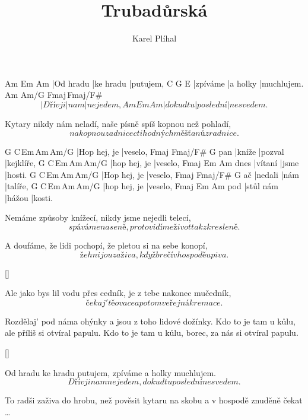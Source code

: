 \documentclass{song}
\title{Trubadůrská}
\author{Karel Plíhal}
\begin{document}
\begin{multicols}{2}

\strophe
Am        Em        Am
|Od hradu |ke hradu |putujem,
C        G        E\7
|zpíváme |a holky |muchlujem.
   Am      Am/G Fmaj\7\,Fmaj\7/F\#
\[ |Dřív ji|nam |nejedem,
Am        Em        Am
|dokud tu |poslední |nesvedem. \]
\endstrophe

\strophe*
Kytary nikdy nám neladí,
naše písně spíš kopnou než pohladí,
\[ nakopnou zadnice
ctihodných měšťanů z radnice. \]
\endstrophe

G            C\,Em\7\,Am\,Am/G
|Hop hej, je |veselo,
    Fmaj\7 Fmaj\7/F\# G
pan |kníže |pozval |kejklíře,
G            C\,Em\7\,Am\,Am/G
|hop hej, je |veselo,
     Fmaj\7  Em    Am
dnes |vítaní |jsme |hosti.
G            C\,Em\7\,Am\,Am/G
|Hop hej, je |veselo,
   Fmaj\7  Fmaj\7/F\# G
ač |nedali |nám |talíře,
G            C\,Em\7\,Am\,Am/G
|hop hej, je |veselo,
    Fmaj\7    Em     Am
pod |stůl nám |hážou |kosti.
\endstrophe

\strophe*
Nemáme způsoby knížecí,
nikdy jsme nejedli telecí,
\[ spáváme na seně,
proto vidíme život tak zkresleně. \]
\endstrophe

\strophe*
A doufáme, že lidi pochopí,
že pletou si na sebe konopí,
\[ že hnijou zaživa,
když brečí v hospodě u piva. \]
\endstrophe

\ref{}

\columnbreak

\strophe*
Ale jako bys lil vodu přes cedník,
je z tebe nakonec mučedník,
\[ čekaj' tě ovace
a potom veřejná kremace. \]
\endstrophe

\strophe*
Rozdělaj' pod náma ohýnky
a jsou z toho lidové dožínky.
Kdo to je tam u kůlu,
ale příliš si otvíral papulu.
Kdo to je tam u kůlu,
borec, za nás si otvíral papulu.
\endstrophe

\ref{}

\strophe*
Od hradu ke hradu putujem,
zpíváme a holky muchlujem.
\[ Dřív jinam   nejedem,
dokud tu poslední nesvedem. \]
\endstrophe

\strophe*
To radši zaživa do hrobu,
než pověsit kytaru na skobu
a v hospodě znuděně čekat \ldots
\endstrophe

\end{multicols}
\end{document}
